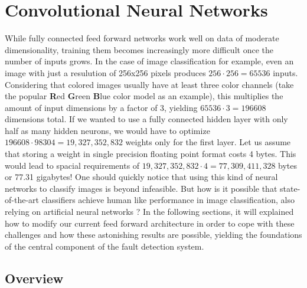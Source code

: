 \chapter{Convolutional Neural Networks}
\label{sec:convnets}

While fully connected feed forward networks work well on data of
moderate dimensionality, training them becomes increasingly more
difficult once the number of inputs grows. In the case of image
classification for example, even an image with just a resulution of
256x256 pixels produces \(256 \cdot 256 = 65536\) inputs. Considering
that colored images usually have at least three color channels (take
the popular \textbf{R}ed \textbf{G}reen \textbf{B}lue color model as
an example), this multiplies the amount of input dimensions by a
factor of 3, yielding \(65536 \cdot 3 = 196608\) dimensions total. If
we wanted to use a fully connected hidden layer with only half as many
hidden neurons, we would have to optimize \(196608 \cdot 98304 =
19,327,352,832\) weights only for the first layer. Let us assume that
storing a weight in single precision floating point format
costs 4 bytes. This
would lead to spacial requirements of \(19,327,352,832 \cdot 4 =
77,309,411,328\) bytes or 77.31 gigabytes! One should quickly notice
that using this kind of neural networks to classify images is beyond
infeasible. But how is it possible that state-of-the-art classifiers
achieve human like performance in image classification, also
relying on artificial neural networks \cite{Russakovsky}? In the
following sections, it will explained how to modify our current feed
forward architecture in order to cope with these challenges and how
these astonishing results are possible, yielding the foundations of
the central component of the fault detection system.

\section{Overview}
\label{sec:conv-overview}


